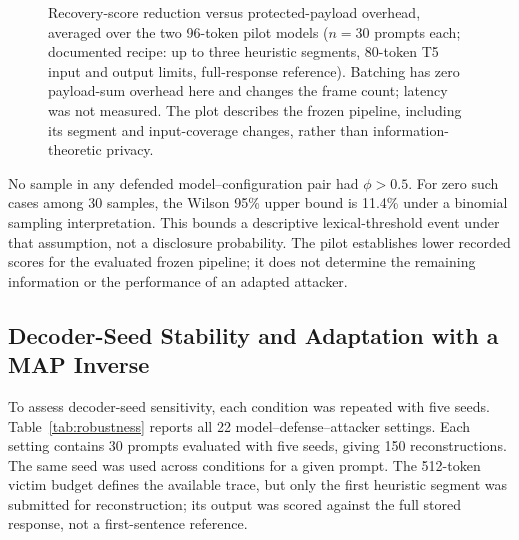 \documentclass[electronics,article,submit,pdftex,moreauthors]{Definitions/mdpi}
\begin{document}
\begin{figure}[ht]
\centering
{}
\caption{Recovery-score reduction versus protected-payload overhead, averaged over the two 96-token pilot models ($n=30$ prompts each; documented recipe: up to three heuristic segments, 80-token T5 input and output limits, full-response reference). Batching has zero payload-sum overhead here and changes the frame count; latency was not measured. The plot describes the frozen pipeline, including its segment and input-coverage changes, rather than information-theoretic privacy.}
\label{fig:defense_tradeoff}
\end{figure}

No sample in any defended model--configuration pair had $\phi>0.5$. For zero such cases among 30 samples, the Wilson 95\% upper bound is 11.4\% under a binomial sampling interpretation. This bounds a descriptive lexical-threshold event under that assumption, not a disclosure probability. The pilot establishes lower recorded scores for the evaluated frozen pipeline; it does not determine the remaining information or the performance of an adapted attacker.

\subsection{Decoder-Seed Stability and Adaptation with a MAP Inverse}\label{sec:robustness}
To assess decoder-seed sensitivity, each condition was repeated with five seeds. Table~\ref{tab:robustness} reports all 22 model--defense--attacker settings. Each setting contains 30 prompts evaluated with five seeds, giving 150 reconstructions. The same seed was used across conditions for a given prompt. The 512-token victim budget defines the available trace, but only the first heuristic segment was submitted for reconstruction; its output was scored against the full stored response, not a first-sentence reference.
\end{document}
